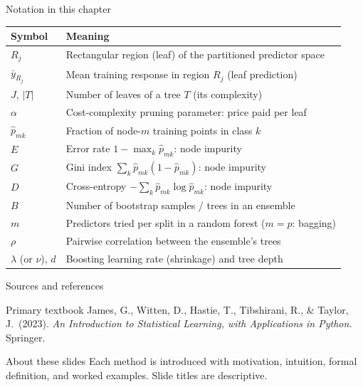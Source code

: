 \documentclass[aspectratio=169,11pt]{beamer}
\begin{document}
\begin{frame}{Notation in this chapter}
  \footnotesize
  \begin{center}
  \begin{tabular}{@{}ll@{}}
    \toprule
    \textbf{Symbol} & \textbf{Meaning} \\
    \midrule
    $R_j$ & Rectangular region (leaf) of the partitioned predictor space \\
    $\bar y_{R_j}$ & Mean training response in region $R_j$ (leaf prediction) \\
    $J$, $|T|$ & Number of leaves of a tree $T$ (its complexity) \\
    $\alpha$ & Cost-complexity pruning parameter: price paid per leaf \\
    $\hat p_{mk}$ & Fraction of node-$m$ training points in class $k$ \\
    $E$ & Error rate $1-\max_k \hat p_{mk}$: node impurity \\
    $G$ & Gini index $\sum_k \hat p_{mk}(1-\hat p_{mk})$: node impurity \\
    $D$ & Cross-entropy $-\sum_k \hat p_{mk}\log\hat p_{mk}$: node impurity \\
    $B$ & Number of bootstrap samples / trees in an ensemble \\
    $m$ & Predictors tried per split in a random forest ($m=p$: bagging) \\
    $\rho$ & Pairwise correlation between the ensemble's trees \\
    $\lambda$ (or $\nu$), $d$ & Boosting learning rate (shrinkage) and tree depth \\
    \bottomrule
  \end{tabular}
  \end{center}
\end{frame}

\begin{frame}{Sources and references}
  \begin{block}{Primary textbook}
    James, G., Witten, D., Hastie, T., Tibshirani, R., \& Taylor, J.\ (2023).
    \emph{An Introduction to Statistical Learning, with Applications in
    Python.} Springer.
  \end{block}
  \begin{block}{About these slides}
    Each method is introduced with motivation, intuition, formal
    definition, and worked examples. Slide titles are descriptive.
  \end{block}
\end{frame}
\end{document}
